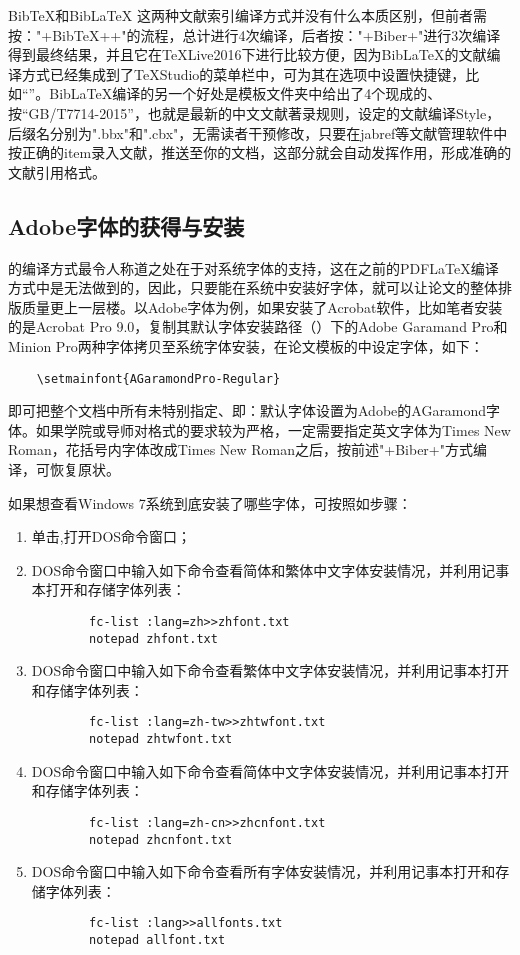 Bib\TeX{}和Bib\LaTeX{} 这两种文献索引编译方式并没有什么本质区别，但前者需按："+Bib\TeX{}++"的流程，总计进行4次编译，后者按："+Biber+"进行3次编译得到最终结果，并且它在\TeX{}Live2016下进行比较方便，因为Bib\LaTeX{}的文献编译方式已经集成到了\TeX{}Studio的菜单栏中，可为其在选项中设置快捷键，比如“”。Bib\LaTeX{}编译的另一个好处是模板文件夹中给出了4个现成的、按“GB/T7714-2015”，也就是最新的中文文献著录规则，设定的文献编译Style，后缀名分别为".bbx"和".cbx"，无需读者干预修改，只要在jabref等文献管理软件中按正确的item录入文献，推送至你的文档，这部分就会自动发挥作用，形成准确的文献引用格式。

\subsection{Adobe字体的获得与安装}
的编译方式最令人称道之处在于对系统字体的支持，这在之前的PDF\LaTeX{}编译方式中是无法做到的，因此，只要能在系统中安装好字体，就可以让论文的整体排版质量更上一层楼。以Adobe字体为例，如果安装了Acrobat软件，比如笔者安装的是Acrobat Pro 9.0，复制其默认字体安装路径（）下的Adobe Garamand Pro和Minion Pro两种字体拷贝至系统字体安装，在论文模板的中设定字体，如下：
\begin{lstlisting}
	\setmainfont{AGaramondPro-Regular}
\end{lstlisting}
即可把整个文档中所有未特别指定、即：默认字体设置为Adobe的AGaramond字体。如果学院或导师对格式的要求较为严格，一定需要指定英文字体为Times New Roman，花括号内字体改成Times New Roman之后，按前述"+Biber+"方式编译，可恢复原状。

如果想查看Windows 7系统到底安装了哪些字体，可按照如步骤：
\begin{enumerate}
	\item 单击,打开DOS命令窗口；
	\item DOS命令窗口中输入如下命令查看简体和繁体中文字体安装情况，并利用记事本打开和存储字体列表：
	\begin{lstlisting}
		fc-list :lang=zh>>zhfont.txt
		notepad zhfont.txt
	\end{lstlisting}
	\item DOS命令窗口中输入如下命令查看繁体中文字体安装情况，并利用记事本打开和存储字体列表：
	\begin{lstlisting}
		fc-list :lang=zh-tw>>zhtwfont.txt
		notepad zhtwfont.txt
	\end{lstlisting}
	\item DOS命令窗口中输入如下命令查看简体中文字体安装情况，并利用记事本打开和存储字体列表：
	\begin{lstlisting}
		fc-list :lang=zh-cn>>zhcnfont.txt
		notepad zhcnfont.txt
	\end{lstlisting}
	\item DOS命令窗口中输入如下命令查看所有字体安装情况，并利用记事本打开和存储字体列表：
	\begin{lstlisting}
		fc-list :lang>>allfonts.txt
		notepad allfont.txt
	\end{lstlisting}
\end{enumerate}
